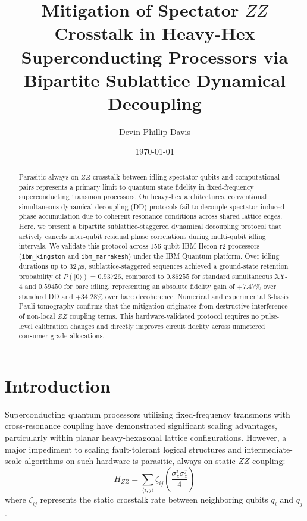 \documentclass[aps,prapplied,reprint,superscriptaddress]{revtex4-2}
\begin{document}
\title{Mitigation of Spectator $ZZ$ Crosstalk in Heavy-Hex Superconducting Processors via Bipartite Sublattice Dynamical Decoupling}

\author{Devin Phillip Davis}

\date{\today}

\begin{abstract}
Parasitic always-on $ZZ$ crosstalk between idling spectator qubits and computational pairs represents a primary limit to quantum state fidelity in fixed-frequency superconducting transmon processors. On heavy-hex architectures, conventional simultaneous dynamical decoupling (DD) protocols fail to decouple spectator-induced phase accumulation due to coherent resonance conditions across shared lattice edges. Here, we present a bipartite sublattice-staggered dynamical decoupling protocol that actively cancels inter-qubit residual phase correlations during multi-qubit idling intervals. We validate this protocol across 156-qubit IBM Heron r2 processors (\texttt{ibm\_kingston} and \texttt{ibm\_marrakesh}) under the IBM Quantum platform. Over idling durations up to $32\,\mu\text{s}$, sublattice-staggered sequences achieved a ground-state retention probability of $P(|0\rangle) = 0.93726$, compared to $0.86255$ for standard simultaneous XY-4 and $0.59450$ for bare idling, representing an absolute fidelity gain of $+7.47\%$ over standard DD and $+34.28\%$ over bare decoherence. Numerical and experimental 3-basis Pauli tomography confirms that the mitigation originates from destructive interference of non-local $ZZ$ coupling terms. This hardware-validated protocol requires no pulse-level calibration changes and directly improves circuit fidelity across unmetered consumer-grade allocations.
\end{abstract}

\maketitle

\section{Introduction}
Superconducting quantum processors utilizing fixed-frequency transmons with cross-resonance coupling have demonstrated significant scaling advantages, particularly within planar heavy-hexagonal lattice configurations. However, a major impediment to scaling fault-tolerant logical structures and intermediate-scale algorithms on such hardware is parasitic, always-on static $ZZ$ coupling:
\begin{equation}
    H_{ZZ} = \sum_{\langle i, j \rangle} \zeta_{ij} \left(\frac{\sigma_z^i \sigma_z^j}{4}\right)
\end{equation}
where $\zeta_{ij}$ represents the static crosstalk rate between neighboring qubits $q_i$ and $q_j$. 
\end{document}
